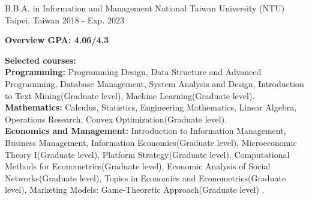 

\begin{cventries}

  \cventry
    {B.B.A. in Information and Management} %
    {National Taiwan University (NTU)} %
    {Taipei, Taiwan} %
    {2018 - Exp. 2023} %
    {
      \begin{cvitems} %
        \item {\textbf{Overview GPA: 4.06/4.3}}
        \item {\textbf{Selected courses:} \\
                \textbf{Programming:}
                Programming Design,
                Data Structure and Advanced Programming,
                Database Management,
                System Analysis and Design,
                Introduction to Text Mining(Graduate level),
                Machine Learning(Graduate level).\\
                \textbf{Mathematics:}
                Calculus,
                Statistics,
                Engineering Mathematics,
                Linear Algebra,
                Operations Research,
                Convex Optimization(Graduate level). \\
                \textbf{Economics and Management:}
                Introduction to Information Management,
                Business Management,
                Information Economics(Graduate level),
                Microeconomic Theory I(Graduate level),
                Platform Strategy(Graduate level),
                Computational Methods for Econometrics(Graduate level),
                Economic Analysis of Social Networks(Graduate level),
                Topics in Economics and Econometrics(Graduate level),
                Marketing Models: Game-Theoretic Approach(Graduate level)
            .}
      \end{cvitems}
    }

\end{cventries}
